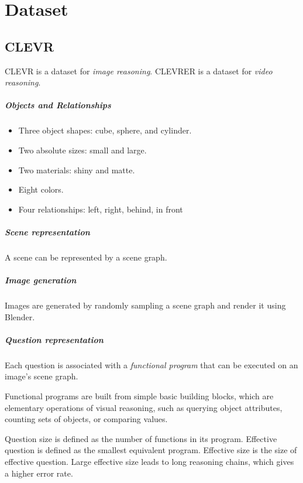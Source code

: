\chapter{Dataset}

\section{CLEVR}
CLEVR\cite{CLEVR} is a dataset for \textit{image reasoning}. CLEVRER is a dataset for \textit{video reasoning}.

\paragraph{Objects and Relationships}
\begin{itemize}
	\item Three object shapes: cube, sphere, and cylinder.
	\item Two absolute sizes: small and large.
	\item Two materials: shiny and matte. 
	\item Eight colors. 
	\item Four relationships: left, right, behind, in front
\end{itemize}

\paragraph{Scene representation}
A scene can be represented by a scene graph.

\paragraph{Image generation}
Images are generated by randomly sampling a scene graph and render it using Blender.

\paragraph{Question representation}
Each question is associated with a \textit{functional program} that can be executed on an image's scene graph.

Functional programs are built from simple basic building blocks, which are elementary operations of visual reasoning, such as querying object attributes, counting sets of objects, or comparing values.

Question size is defined as the number of functions in its program. Effective question is defined as the smallest equivalent program. Effective size is the size of effective question. Large effective size leads to long reasoning chains, which gives a higher error rate.

